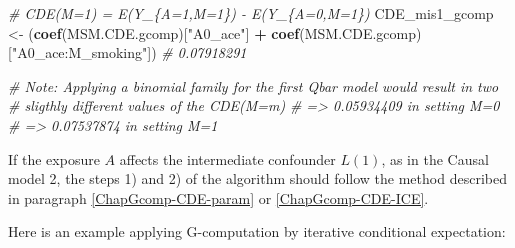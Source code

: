 \documentclass[
]{book}
\newenvironment{Shaded}{\begin{snugshade}}{\end{snugshade}}
\newcommand{\CommentTok}[1]{\textcolor[rgb]{0.56,0.35,0.01}{\textit{#1}}}
\newcommand{\FunctionTok}[1]{\textcolor[rgb]{0.13,0.29,0.53}{\textbf{#1}}}
\newcommand{\NormalTok}[1]{#1}
\newcommand{\OtherTok}[1]{\textcolor[rgb]{0.56,0.35,0.01}{#1}}
\newcommand{\SpecialCharTok}[1]{\textcolor[rgb]{0.81,0.36,0.00}{\textbf{#1}}}
\newcommand{\StringTok}[1]{\textcolor[rgb]{0.31,0.60,0.02}{#1}}
\begin{document}
\begin{Shaded}
\begin{Highlighting}[]
\CommentTok{\# CDE(M=1) = E(Y\_\{A=1,M=1\}) {-} E(Y\_\{A=0,M=1\})}
\NormalTok{CDE\_mis1\_gcomp }\OtherTok{\textless{}{-}}\NormalTok{ (}\FunctionTok{coef}\NormalTok{(MSM.CDE.gcomp)[}\StringTok{"A0\_ace"}\NormalTok{] }\SpecialCharTok{+}
                     \FunctionTok{coef}\NormalTok{(MSM.CDE.gcomp)[}\StringTok{"A0\_ace:M\_smoking"}\NormalTok{])}
\CommentTok{\# 0.07918291}

\CommentTok{\# Note: Applying a binomial family for the first Qbar model would result in two}
\CommentTok{\# sligthly different values of the CDE(M=m)}
\CommentTok{\# =\textgreater{} 0.05934409 in setting M=0}
\CommentTok{\# =\textgreater{} 0.07537874 in setting M=1}
\end{Highlighting}
\end{Shaded}

If the exposure \(A\) affects the intermediate confounder \(L(1)\), as in the Causal model 2, the steps 1) and 2) of the algorithm should follow the method described in paragraph \ref{ChapGcomp-CDE-param} or \ref{ChapGcomp-CDE-ICE}.

Here is an example applying G-computation by iterative conditional expectation:
\end{document}
